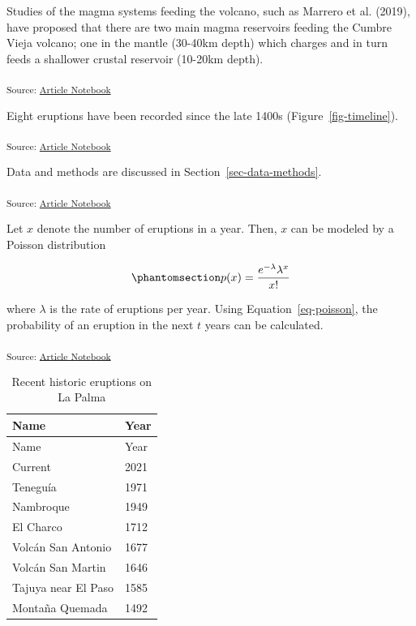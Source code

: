 \documentclass[
]{agujournal2019}
\begin{document}
Studies of the magma systems feeding the volcano, such as Marrero et al.
(2019), have proposed that there are two main magma reservoirs feeding
the Cumbre Vieja volcano; one in the mantle (30-40km depth) which
charges and in turn feeds a shallower crustal reservoir (10-20km depth).

\textsubscript{Source:
\href{https://quadroc.github.io/Quartoimport/index.ipynb.html}{Article
Notebook}}

Eight eruptions have been recorded since the late 1400s
(Figure~\ref{fig-timeline}).

\textsubscript{Source:
\href{https://quadroc.github.io/Quartoimport/index.ipynb.html}{Article
Notebook}}

Data and methods are discussed in Section~\ref{sec-data-methods}.

\textsubscript{Source:
\href{https://quadroc.github.io/Quartoimport/index.ipynb.html}{Article
Notebook}}

Let \(x\) denote the number of eruptions in a year. Then, \(x\) can be
modeled by a Poisson distribution

\begin{equation}\phantomsection\label{eq-poisson}{
p(x) = \frac{e^{-\lambda} \lambda^{x}}{x !}
}\end{equation}

where \(\lambda\) is the rate of eruptions per year. Using
Equation~\ref{eq-poisson}, the probability of an eruption in the next
\(t\) years can be calculated.

\textsubscript{Source:
\href{https://quadroc.github.io/Quartoimport/index.ipynb.html}{Article
Notebook}}

\begin{longtable}[]{@{}ll@{}}
\caption{Recent historic eruptions on La
Palma}\label{tbl-history}\tabularnewline
\toprule\noalign{}
Name & Year \\
\midrule\noalign{}
\endfirsthead
\toprule\noalign{}
Name & Year \\
\midrule\noalign{}
\endhead
\bottomrule\noalign{}
\endlastfoot
Current & 2021 \\
Teneguía & 1971 \\
Nambroque & 1949 \\
El Charco & 1712 \\
Volcán San Antonio & 1677 \\
Volcán San Martin & 1646 \\
Tajuya near El Paso & 1585 \\
Montaña Quemada & 1492 \\
\end{longtable}
\end{document}
